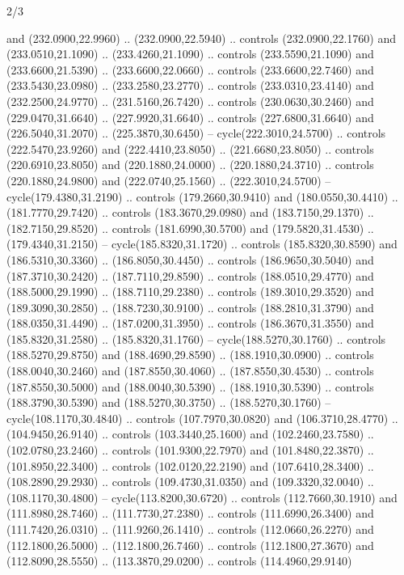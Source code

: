 \begin{flagdescription}{2/3}
\begin{scope}[xshift=0.5\flaglength,yshift=0.5\flagwidth,scale=\stretchfactor]
\begin{scope}[scale=0.001645\flagwidth,yshift=65mm,xshift=-63mm]
\begin{scope}[y=0.80pt, x=0.80pt, yscale=-1,]
\begin{scope}[cm={{1.33333,0.0,0.0,1.33333,(0.0,1e-05)}}]
  and (232.0900,22.9960) .. (232.0900,22.5940) .. controls (232.0900,22.1760)
  and (233.0510,21.1090) .. (233.4260,21.1090) .. controls (233.5590,21.1090)
  and (233.6600,21.5390) .. (233.6600,22.0660) .. controls (233.6600,22.7460)
  and (233.5430,23.0980) .. (233.2580,23.2770) .. controls (233.0310,23.4140)
  and (232.2500,24.9770) .. (231.5160,26.7420) .. controls (230.0630,30.2460)
  and (229.0470,31.6640) .. (227.9920,31.6640) .. controls (227.6800,31.6640)
  and (226.5040,31.2070) .. (225.3870,30.6450) -- cycle(222.3010,24.5700) ..
  controls (222.5470,23.9260) and (222.4410,23.8050) .. (221.6680,23.8050) ..
  controls (220.6910,23.8050) and (220.1880,24.0000) .. (220.1880,24.3710) ..
  controls (220.1880,24.9800) and (222.0740,25.1560) .. (222.3010,24.5700) --
  cycle(179.4380,31.2190) .. controls (179.2660,30.9410) and (180.0550,30.4410)
  .. (181.7770,29.7420) .. controls (183.3670,29.0980) and (183.7150,29.1370) ..
  (182.7150,29.8520) .. controls (181.6990,30.5700) and (179.5820,31.4530) ..
  (179.4340,31.2150) -- cycle(185.8320,31.1720) .. controls (185.8320,30.8590)
  and (186.5310,30.3360) .. (186.8050,30.4450) .. controls (186.9650,30.5040)
  and (187.3710,30.2420) .. (187.7110,29.8590) .. controls (188.0510,29.4770)
  and (188.5000,29.1990) .. (188.7110,29.2380) .. controls (189.3010,29.3520)
  and (189.3090,30.2850) .. (188.7230,30.9100) .. controls (188.2810,31.3790)
  and (188.0350,31.4490) .. (187.0200,31.3950) .. controls (186.3670,31.3550)
  and (185.8320,31.2580) .. (185.8320,31.1760) -- cycle(188.5270,30.1760) ..
  controls (188.5270,29.8750) and (188.4690,29.8590) .. (188.1910,30.0900) ..
  controls (188.0040,30.2460) and (187.8550,30.4060) .. (187.8550,30.4530) ..
  controls (187.8550,30.5000) and (188.0040,30.5390) .. (188.1910,30.5390) ..
  controls (188.3790,30.5390) and (188.5270,30.3750) .. (188.5270,30.1760) --
  cycle(108.1170,30.4840) .. controls (107.7970,30.0820) and (106.3710,28.4770)
  .. (104.9450,26.9140) .. controls (103.3440,25.1600) and (102.2460,23.7580) ..
  (102.0780,23.2460) .. controls (101.9300,22.7970) and (101.8480,22.3870) ..
  (101.8950,22.3400) .. controls (102.0120,22.2190) and (107.6410,28.3400) ..
  (108.2890,29.2930) .. controls (109.4730,31.0350) and (109.3320,32.0040) ..
  (108.1170,30.4800) -- cycle(113.8200,30.6720) .. controls (112.7660,30.1910)
  and (111.8980,28.7460) .. (111.7730,27.2380) .. controls (111.6990,26.3400)
  and (111.7420,26.0310) .. (111.9260,26.1410) .. controls (112.0660,26.2270)
  and (112.1800,26.5000) .. (112.1800,26.7460) .. controls (112.1800,27.3670)
  and (112.8090,28.5550) .. (113.3870,29.0200) .. controls (114.4960,29.9140)

\end{scope}
\end{scope}
\end{scope}
\end{scope}
\end{flagdescription}
